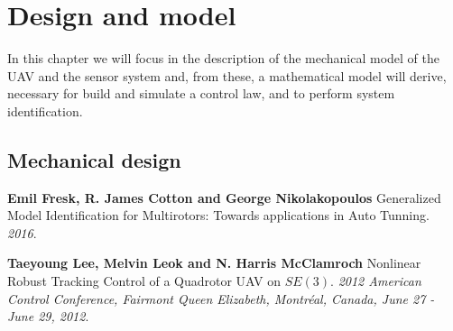 \documentclass[11pt, a4paper, onecolumn, fleqn, twoside, titlepage, openright]{book}
\begin{document}
	\chapter{Design and model}
	\label{designModel}

	In this chapter we will focus in the description of the mechanical model of the UAV and the sensor system and, from these, a mathematical model will derive, necessary for build and simulate a control law, and to perform system identification.

	\section{Mechanical design}
	\label{mechanicalDesign}













	\begin{thebibliography}{1}
	\label{bibliography}

		\textbf{Emil Fresk, R. James Cotton and George Nikolakopoulos}
		Generalized Model Identification for Multirotors: Towards applications in Auto Tunning.
		\textit{2016}.

		\textbf{Taeyoung Lee, Melvin Leok and N. Harris McClamroch}
		Nonlinear Robust Tracking Control of a Quadrotor UAV on $SE(3)$.
		\textit{2012 American Control Conference, Fairmont Queen Elizabeth, Montréal, Canada, June 27 - June 29, 2012}.

	\end{thebibliography}
\end{document}
